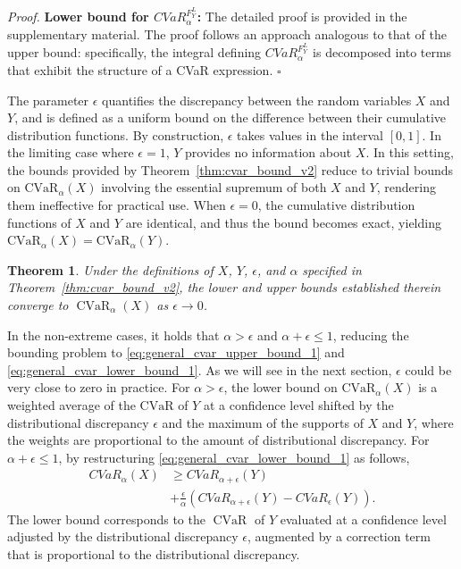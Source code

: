 \documentclass[letterpaper]{article} %
\newtheorem{theorem}{Theorem}[section]
\newenvironment{proof}{\noindent\textit{Proof.}}{\hfill$\square$}
\begin{document}
\begin{proof}
	\textbf{Lower bound for $CVaR_\alpha^{F_Y^L}$:} The detailed proof is provided in the supplementary material. The proof follows an approach analogous to that of the upper bound: specifically, the integral defining $CVaR_\alpha^{F_Y^L}$ is decomposed into terms that exhibit the structure of a CVaR expression.
\end{proof}

The parameter $\epsilon$ quantifies the discrepancy between the random variables $X$ and $Y$, and is defined as a uniform bound on the difference between their cumulative distribution functions. By construction, $\epsilon$ takes values in the interval $[0,1]$. In the limiting case where $\epsilon = 1$, $Y$ provides no information about $X$. In this setting, the bounds provided by Theorem~\ref{thm:cvar_bound_v2} reduce to trivial bounds on $\mathrm{CVaR}_\alpha(X)$ involving the essential supremum of both $X$ and $Y$, rendering them ineffective for practical use. When $\epsilon = 0$, the cumulative distribution functions of $X$ and $Y$ are identical, and thus the bound becomes exact, yielding $\mathrm{CVaR}_\alpha(X) = \mathrm{CVaR}_\alpha(Y)$. 
\begin{theorem}\label{thm:cvar_bound_convergence}
	Under the definitions of $X$, $Y$, $\epsilon$, and $\alpha$ specified in Theorem~\ref{thm:cvar_bound_v2}, the lower and upper bounds established therein converge to $\operatorname{CVaR}_\alpha(X)$ as $\epsilon \to 0$.
\end{theorem}
In the non-extreme cases, it holds that $\alpha>\epsilon$ and $\alpha+\epsilon\leq 1$, reducing the bounding problem to \eqref{eq:general_cvar_upper_bound_1} and \eqref{eq:general_cvar_lower_bound_1}. As we will see in the next section, $\epsilon$ could be very close to zero in practice. For $\alpha > \epsilon$, the lower bound on $\mathrm{CVaR}_\alpha(X)$ is a weighted average of the $\mathrm{CVaR}$ of $Y$ at a confidence level shifted by the distributional discrepancy $\epsilon$ and the maximum of the supports of $X$ and $Y$, where the weights are proportional to the amount of distributional discrepancy. For $\alpha+\epsilon \leq 1$, by restructuring \eqref{eq:general_cvar_lower_bound_1} as follows, 
\begin{equation}
	\begin{aligned}
		CVaR_{\alpha}(X) &\geq CVaR_{\alpha+\epsilon}(Y) \\
		&+ \frac{\epsilon}{\alpha}(CVaR_{\alpha+\epsilon}(Y)- CVaR_{\epsilon}(Y)).
	\end{aligned}
\end{equation}
The lower bound corresponds to the $\operatorname{CVaR}$ of $Y$ evaluated at a confidence level adjusted by the distributional discrepancy $\epsilon$, augmented by a correction term that is proportional to the distributional discrepancy.
\end{document}
